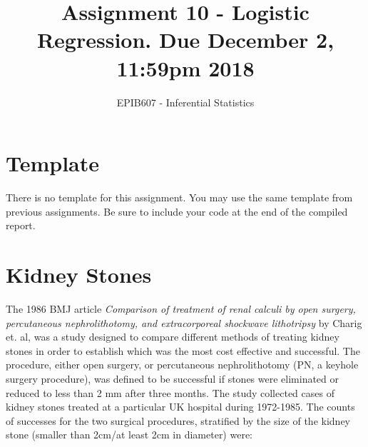 \documentclass[letterpaper,9pt,twoside,printwatermark=false]{pinp}
\title{Assignment 10 - Logistic Regression. Due December 2, 11:59pm 2018}
\author[a]{EPIB607 - Inferential Statistics}
\affil[a]{Fall 2018, McGill University}
\begin{document}
\verticaladjustment{-2pt}

\maketitle
\thispagestyle{firststyle}



\section*{Template}\label{template}

There is no template for this assignment. You may use the same template
from previous assignments. Be sure to include your code at the end of
the compiled report.

\section{Kidney Stones}\label{kidney-stones}

The 1986 BMJ article
\textit{Comparison of treatment of renal calculi by open surgery, percutaneous nephrolithotomy, and extracorporeal shockwave lithotripsy}
by Charig et. al, was a study designed to compare different methods of
treating kidney stones in order to establish which was the most cost
effective and successful. The procedure, either open surgery, or
percutaneous nephrolithotomy (PN, a keyhole surgery procedure), was
defined to be successful if stones were eliminated or reduced to less
than 2 mm after three months. The study collected cases of kidney stones
treated at a particular UK hospital during 1972-1985. The counts of
successes for the two surgical procedures, stratified by the size of the
kidney stone (smaller than 2cm/at least 2cm in diameter) were:
\end{document}
